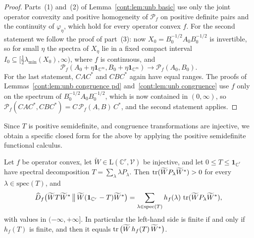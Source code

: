 \begin{proof}
Parts~(1) and~(2) of Lemma~\ref{cont:lem:unb basic} use only the joint operator convexity and positive homogeneity of $\mathcal{P}_f$ on positive definite pairs and the continuity of $\varphi_\eta$, which hold for every operator convex $f$. For the second statement we follow the proof of part~(3): now $X_0=B_0^{-1/2}A_0B_0^{-1/2}$ is invertible, so for small $\eta$ the spectra of $X_\eta$ lie in a fixed compact interval $I_0\subseteq[\frac12\lambda_{\min}(X_0),\infty)$, where $f$ is continuous, and
\[
\mathcal{P}_f(A_0+\eta\mathbf{1}_{\mathbb{C}^m},B_0+\eta\mathbf{1}_{\mathbb{C}^m})\to\mathcal{P}_f(A_0,B_0).
\]
For the last statement, $CAC^*$ and $CBC^*$ again have equal ranges. The proofs of Lemmas~\ref{cont:lem:unb congruence pd} and~\ref{cont:lem:unb congruence} use $f$ only on the spectrum of $B_0^{-1/2}A_0B_0^{-1/2}$, which is now contained in $(0,\infty)$, so $\mathcal{P}_f(CAC^*,CBC^*)=C\,\mathcal{P}_f(A,B)\,C^*$, and the second statement applies.
\end{proof}

Since $T$ is positive semidefinite, and congruence transformations are injective, we obtain a specific closed form for the above by applying the positive semidefinite functional calculus.  

\begin{lemma}\label{cont:lem:mixing}
Let $f$ be operator convex, let $\widetilde{W}\in\mathrm{L}(\mathbb{C}^r,\mathcal{V})$ be injective, and let $0\leq T\leq\mathbf{1}_{\mathbb{C}^r}$ have spectral decomposition $T=\sum_\lambda\lambda P_\lambda$. Then $\operatorname{tr}(\widetilde{W}P_\lambda \widetilde{W}^*)>0$ for every $\lambda\in\mathrm{spec}(T)$, and
\[
\widehat{D}_f\big(\widetilde{W}T\widetilde{W}^*\,\big\|\,\widetilde{W}(\mathbf{1}_{\mathbb{C}^r}-T)\widetilde{W}^*\big)=\sum_{\lambda\in\mathrm{spec}(T)}h_f(\lambda)\,\operatorname{tr}(\widetilde{W}P_\lambda \widetilde{W}^*),
\]
with values in $(-\infty,+\infty]$.
In particular the left-hand side is finite if and only if $h_f(T)$ is finite, and then it equals $\operatorname{tr}\big(\widetilde{W}\,h_f(T)\,\widetilde{W}^*\big)$.
\end{lemma}


